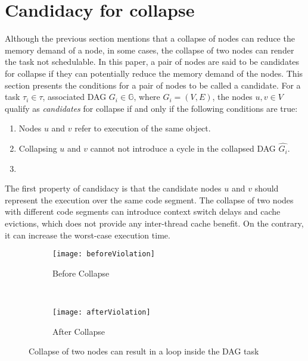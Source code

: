 \section{Candidacy for collapse}
Although the previous section mentions that a collapse of nodes can reduce the memory demand of a node,  in some cases, the collapse of two nodes can render the task not schedulable. In this paper, a pair of nodes are said to be candidates for collapse if they can potentially reduce the memory demand of the nodes. This section presents the conditions for a pair of nodes to be called a candidate. For a task ${\tau_i \in \tau}$, associated DAG ${G_i \in \mathbb{G}}$,
where ${G_i = (V, E)}$, the nodes ${u,v \in V}$ qualify as
\emph{candidates} for collapse if and only if the following conditions
are true: 
\begin{enumerate}
  \item Nodes ${u}$ and ${v}$ refer to execution of the same object.
  \item Collapsing ${u}$ and ${v}$ cannot not introduce a cycle in the collapsed DAG $\hat{G_i}$.
  \item {}
\end{enumerate}

The first property of candidacy is that the candidate nodes $u$ and $v$ should represent the execution over the same code segment. The collapse of two nodes with different code segments can introduce context switch delays and cache evictions, which does not provide any inter-thread cache benefit. On the contrary, it can increase the worst-case execution time. 



\begin{figure}
  \centering
  \begin{subfigure}[b]{0.48\textwidth}{
      \texttt{[image: beforeViolation]}
      \caption{Before Collapse}
      \label{fig:beforeViolation}
    }
  \end{subfigure}~
  \begin{subfigure}[b]{0.33\textwidth}{
      \texttt{[image: afterViolation]}
      \caption{After Collapse}
      \label{fig:afterViolation}
    }
  \end{subfigure}
  \caption{Collapse of two nodes can result in a loop inside the DAG task}
  \label{fig:dag-violation}
\end{figure}


